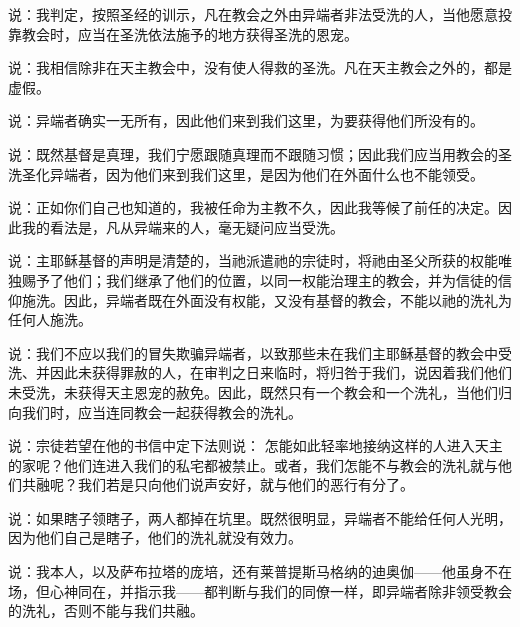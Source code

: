  说：我判定，按照圣经的训示，凡在教会之外由异端者非法受洗的人，当他愿意投靠教会时，应当在圣洗依法施予的地方获得圣洗的恩宠。\par

 说：我相信除非在天主教会中，没有使人得救的圣洗。凡在天主教会之外的，都是虚假。\par

 说：异端者确实一无所有，因此他们来到我们这里，为要获得他们所没有的。\par

 说：既然基督是真理，我们宁愿跟随真理而不跟随习惯；因此我们应当用教会的圣洗圣化异端者，因为他们来到我们这里，是因为他们在外面什么也不能领受。\par

 说：正如你们自己也知道的，我被任命为主教不久，因此我等候了前任的决定。因此我的看法是，凡从异端来的人，毫无疑问应当受洗。\par

说：主耶稣基督的声明是清楚的，当祂派遣祂的宗徒时，将祂由圣父所获的权能唯独赐予了他们；我们继承了他们的位置，以同一权能治理主的教会，并为信徒的信仰施洗。因此，异端者既在外面没有权能，又没有基督的教会，不能以祂的洗礼为任何人施洗。\par

说：我们不应以我们的冒失欺骗异端者，以致那些未在我们主耶稣基督的教会中受洗、并因此未获得罪赦的人，在审判之日来临时，将归咎于我们，说因着我们他们未受洗，未获得天主恩宠的赦免。因此，既然只有一个教会和一个洗礼，当他们归向我们时，应当连同教会一起获得教会的洗礼。\par

说：宗徒若望在他的书信中定下法则说： 怎能如此轻率地接纳这样的人进入天主的家呢？他们连进入我们的私宅都被禁止。或者，我们怎能不与教会的洗礼就与他们共融呢？我们若是只向他们说声安好，就与他们的恶行有分了。\par

说：如果瞎子领瞎子，两人都掉在坑里。既然很明显，异端者不能给任何人光明，因为他们自己是瞎子，他们的洗礼就没有效力。\par

说：我本人，以及萨布拉塔的庞培，还有莱普提斯马格纳的迪奥伽——他虽身不在场，但心神同在，并指示我——都判断与我们的同僚一样，即异端者除非领受教会的洗礼，否则不能与我们共融。\par

